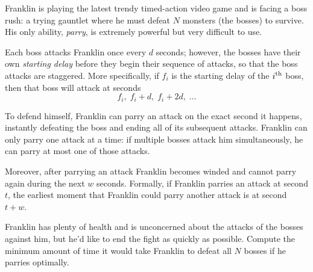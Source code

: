 





Franklin is playing the latest trendy timed-action video game and is facing a boss rush: a trying gauntlet where he must defeat $N$ monsters (the bosses) to survive. His only ability, \textit{parry}, is extremely powerful but very difficult to use.

Each boss attacks Franklin once every $d$ seconds; however, the bosses have their own \emph{starting delay} before they begin their sequence of attacks, so that the boss attacks are staggered. More specifically, if $f_i$ is the starting delay of the $i\textsuperscript{th}$ boss, then that boss will attack at seconds
\[
f_i, \; f_i + d, \; f_i + 2d, \; \ldots
\]

To defend himself, Franklin can parry an attack on the exact second it happens, instantly defeating the boss and ending all of its subsequent attacks. Franklin can only parry one attack at a time: if multiple bosses attack him simultaneously, he can parry at most one of those attacks.

Moreover, after parrying an attack Franklin becomes winded and cannot parry again during the next $w$ seconds. Formally, if Franklin parries an attack at second $t$, the earliest moment that Franklin could parry another attack is at second $t+w$.

Franklin has plenty of health and is unconcerned about the attacks of the bosses against him, but he'd like to end the fight as quickly as possible. Compute the minimum amount of time it would take Franklin to defeat all $N$ bosses if he parries optimally.

